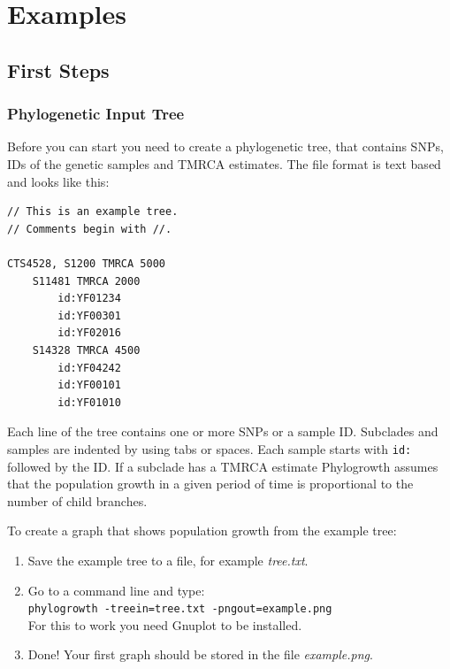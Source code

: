 \section{Examples}

\subsection{First Steps}

\subsubsection*{Phylogenetic Input Tree}

Before you can start you need to create a phylogenetic tree,
that contains SNPs, IDs of the genetic samples and TMRCA
estimates. The file format is text based and looks like this:

\begin{verbatim}
// This is an example tree.
// Comments begin with //.

CTS4528, S1200 TMRCA 5000
    S11481 TMRCA 2000
        id:YF01234
        id:YF00301
        id:YF02016
    S14328 TMRCA 4500
        id:YF04242
        id:YF00101
        id:YF01010
\end{verbatim}

Each line of the tree contains one or more SNPs or a sample
ID. Subclades and samples are indented by using tabs or spaces.
Each sample starts with \texttt{id:} followed by the ID.
If a subclade has a TMRCA estimate Phylogrowth assumes that
the population growth in a given period of time is proportional
to the number of child branches.

To create a graph that shows population growth from the example
tree:

\begin{enumerate}
\item Save the example tree to a file, for example \emph{tree.txt}.
\item Go to a command line and type:\\
	\texttt{phylogrowth -treein=tree.txt -pngout=example.png}\\
	For this to work you need Gnuplot \cite{Gnuplot} to be installed.
\item Done! Your first graph should be stored in the file \emph{example.png}.
\end{enumerate}

